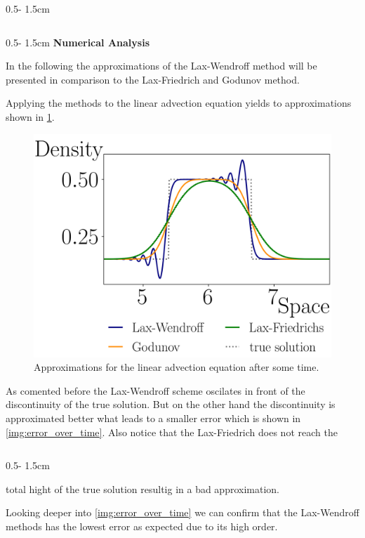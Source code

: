 \documentclass{uibposter}
\begin{document}
\begin{frame}[fragile]
\begin{columns}
\begin{column}{0.5\textwidth - 1.5cm}
\begin{column}{0.5\textwidth - 1.5cm}
\vspace{0.5cm}
\textbf{Numerical Analysis}
\vspace{0.5cm}
    
In the following the approximations of the Lax-Wendroff method will be presented in comparison to the Lax-Friedrich and Godunov method.

\vspace{0.5cm}
Applying the methods to the linear advection equation yields to approximations shown in \cref{img:linar_comprehension}. 

\begin{figure}[h]
	\includegraphics{fig/linear_compare.png}
	\caption{Approximations for the linear advection equation after some time.}
	\label{img:linar_comprehension}
\end{figure}

As comented before the Lax-Wendroff scheme oscilates in front of the discontinuity of the true solution. But on the other hand the discontinuity is approximated better what leads to a smaller error which is shown in \cref{img:error_over_time}. Also notice that the Lax-Friedrich does not reach the 
 
\end{column}
\begin{column}{0.5\textwidth - 1.5cm}
	\vspace*{-1.7cm} 
	
total hight of the true solution resultig in a bad approximation. 

\vspace{0.5cm}
Looking deeper into \cref{img:error_over_time} we can confirm that the Lax-Wendroff methods has the lowest error as expected due to its high order.
   

\end{column}
\end{column}
\end{columns}
\end{frame}
\end{document}
